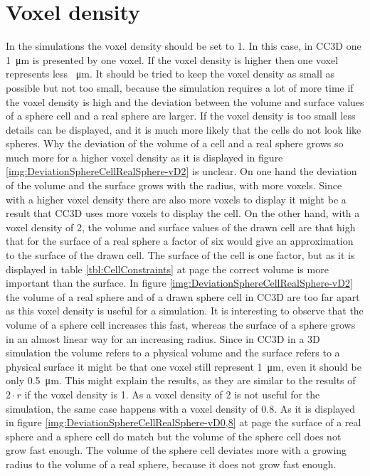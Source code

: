 \section{Voxel density}\label{sec:vD}
In the simulations the voxel density should be set to 1. In this case, in \ac{CC3D} one \SI{1}{\micro\metre} is presented by one voxel. If the voxel density is higher then one voxel represents less \SI{}{\micro\metre}. It should be tried to keep the voxel density as small as possible but not too small, because the simulation requires a lot of more time if the voxel density is high and the deviation between the volume and surface values of a sphere cell and a real sphere are larger. If the voxel density is too small less details can be displayed, and it is much more likely that the cells do not look like spheres. Why the deviation of the volume of a cell and a real sphere grows so much more for a higher voxel density as it is displayed in figure \ref{img:DeviationSphereCellRealSphere-vD2} is unclear. \newline
On one hand the deviation of the volume and the surface grows with the radius, with more voxels. Since with a higher voxel density there are also more voxels to display it might be a result that \ac{CC3D} uses more voxels to display the cell. On the other hand, with a voxel density of 2, the volume and surface values of the drawn cell are that high that for the surface of a real sphere a factor of six would give an approximation to the surface of the drawn cell. \newline
The surface of the cell is one factor, but as it is displayed in table \ref{tbl:CellConstraints} at page \pageref{tbl:CellConstraints} the correct volume is more important than the surface. In figure \ref{img:DeviationSphereCellRealSphere-vD2} the volume of a real sphere and of a drawn sphere cell in \ac{CC3D} are too far apart as this voxel density is useful for a simulation. It is interesting to observe that the volume of a sphere cell increases this fast, whereas the surface of a sphere grows in an almost linear way for an increasing radius. Since in \ac{CC3D} in a 3D simulation the volume refers to a physical volume and the surface refers to a physical surface it might be that one voxel still represent \SI{1}{\micro\metre}, even it should be only \SI{0.5}{\micro\metre}. This might explain the results, as they are similar to the results of $2 \cdot r$ if the voxel density is 1. \newline
As a voxel density of 2 is not useful for the simulation, the same case happens with a voxel density of 0.8. As it is displayed in figure \ref{img:DeviationSphereCellRealSphere-vD0,8} at page \pageref{img:DeviationSphereCellRealSphere-vD0,8} the surface of a real sphere and a sphere cell do match but the volume of the sphere cell does not grow fast enough. The volume of the sphere cell deviates more with a growing radius to the volume of a real sphere, because it does not grow fast enough. \newline
